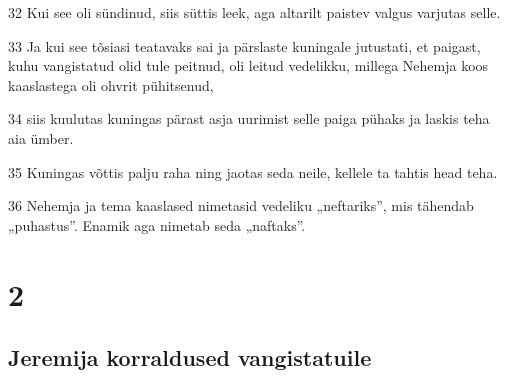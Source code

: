 \par 32 Kui see oli sündinud, siis süttis leek, aga altarilt paistev valgus varjutas selle.
\par 33 Ja kui see tõsiasi teatavaks sai ja pärslaste kuningale jutustati, et paigast, kuhu vangistatud olid tule peitnud, oli leitud vedelikku, millega Nehemja koos kaaslastega oli ohvrit pühitsenud,
\par 34 siis kuulutas kuningas pärast asja uurimist selle paiga pühaks ja laskis teha aia ümber.
\par 35 Kuningas võttis palju raha ning jaotas seda neile, kellele ta tahtis head teha.
\par 36 Nehemja ja tema kaaslased nimetasid vedeliku „neftariks”, mis tähendab „puhastus”. Enamik aga nimetab seda „naftaks”.



\chapter{2}


\section*{Jeremija korraldused vangistatuile}

